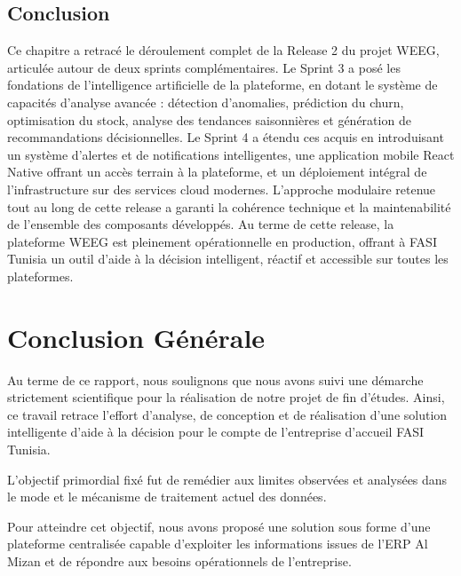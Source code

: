 \documentclass[a4paper,12pt]{report}
\begin{document}
\section{Conclusion}

Ce chapitre a retracé le déroulement complet de la Release 2 du projet WEEG, articulée autour de deux sprints complémentaires. Le Sprint 3 a posé les fondations de l'intelligence artificielle de la plateforme, en dotant le système de capacités d'analyse avancée : détection d'anomalies, prédiction du churn, optimisation du stock, analyse des tendances saisonnières et génération de recommandations décisionnelles. Le Sprint 4 a étendu ces acquis en introduisant un système d'alertes et de notifications intelligentes, une application mobile React Native offrant un accès terrain à la plateforme, et un déploiement intégral de l'infrastructure sur des services cloud modernes. L'approche modulaire retenue tout au long de cette release a garanti la cohérence technique et la maintenabilité de l'ensemble des composants développés. Au terme de cette release, la plateforme WEEG est pleinement opérationnelle en production, offrant à FASI Tunisia un outil d'aide à la décision intelligent, réactif et accessible sur toutes les plateformes.


\chapter*{Conclusion Générale}


Au terme de ce rapport, nous soulignons que nous avons suivi une démarche strictement scientifique pour la réalisation de notre projet de fin d'études. Ainsi, ce travail retrace l'effort d'analyse, de conception et de réalisation d'une solution intelligente d'aide à la décision pour le compte de l'entreprise d'accueil FASI Tunisia.

L'objectif primordial fixé fut de remédier aux limites observées et analysées dans le mode et le mécanisme de traitement actuel des données.

Pour atteindre cet objectif, nous avons proposé une solution sous forme d'une plateforme centralisée capable d'exploiter les informations issues de l'ERP Al Mizan et de répondre aux besoins opérationnels de l'entreprise.
\end{document}
